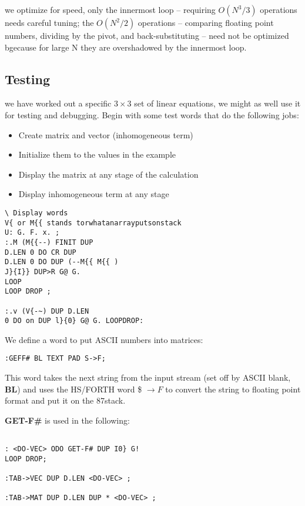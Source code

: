 we optimize for speed, only the innermost loop -- requiring $O (N^3 /3)$ operations needs careful tuning; the $O (N^2/2)$ 
operations -- comparing floating point numbers, dividing by the pivot, and
back-substituting -- need not be optimized bgecause for
large N they are overshadowed by the innermost loop.

\subsection{Testing}
 we have worked out a specific $3 \times 3$ set of linear equations,
we might as well use it for testing and debugging. Begin with
some test words that do the following jobs:

\begin{itemize}
  \item Create matrix and vector (inhomogeneous term)
  \item Initialize them to the values in the example
  \item Display the matrix at any stage of the calculation
  \item Display inhomogeneous term at any stage
\end{itemize}
\begin{verbatim}
\ Display words
V{ or M{{ stands torwhatanarrayputsonstack
U: G. F. x. ;
:.M (M{{--) FINIT DUP
D.LEN 0 DO CR DUP
D.LEN 0 DO DUP (--M{{ M{{ )
J}{I}} DUP>R G@ G.
LOOP
LOOP DROP ;

:.v (V{-~) DUP D.LEN
0 DO on DUP l}{0} G@ G. LOOPDROP:

\end{verbatim}
We define a word to put ASCII numbers into matrices:
\begin{verbatim}
:GEFF# BL TEXT PAD S->F;
\end{verbatim}

This word takes the next string from the input stream (set off
by ASCII blank, \textbf{BL}) and uses the HS/FORTH word \$ $\to F$ to
convert the string to floating point format and put it on the
87stack.

\textbf{GET-F\#} is used in the following:
\begin{verbatim}

: <DO-VEC> ODO GET-F# DUP I0} G!
LOOP DROP;

:TAB->VEC DUP D.LEN <DO-VEC> ;

:TAB->MAT DUP D.LEN DUP * <DO-VEC> ;
\end{verbatim}

